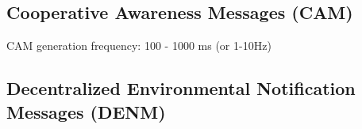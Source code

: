 \subsection{Cooperative Awareness Messages (CAM)}



CAM generation frequency: 100 - 1000 ms (or 1-10Hz)

\subsection{Decentralized Environmental Notification Messages (DENM)}


